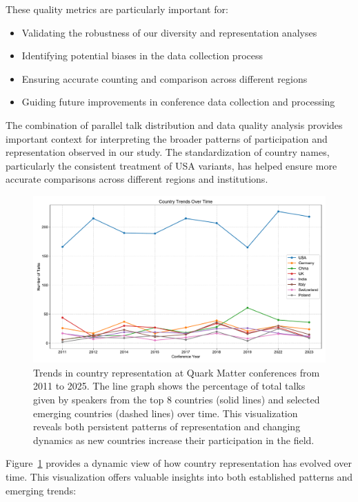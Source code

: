\documentclass[a4paper,11pt]{article}
\begin{document}
These quality metrics are particularly important for:
\begin{itemize}
    \item Validating the robustness of our diversity and representation analyses
    \item Identifying potential biases in the data collection process
    \item Ensuring accurate counting and comparison across different regions
    \item Guiding future improvements in conference data collection and processing
\end{itemize}

The combination of parallel talk distribution and data quality analysis provides important context for interpreting the broader patterns of participation and representation observed in our study. The standardization of country names, particularly the consistent treatment of USA variants, has helped ensure more accurate comparisons across different regions and institutions.

\begin{figure}[H]
\centering
\includegraphics[width=\textwidth]{figures/country_trends_over_time.pdf}
\caption{Trends in country representation at Quark Matter conferences from 2011 to 2025. The line graph shows the percentage of total talks given by speakers from the top 8 countries (solid lines) and selected emerging countries (dashed lines) over time. This visualization reveals both persistent patterns of representation and changing dynamics as new countries increase their participation in the field.}
\label{fig:country_trends}
\end{figure}

Figure~\ref{fig:country_trends} provides a dynamic view of how country representation has evolved over time. This visualization offers valuable insights into both established patterns and emerging trends:
\end{document}
